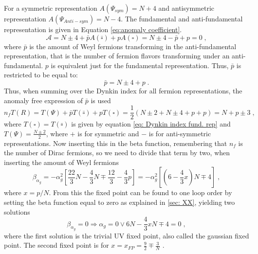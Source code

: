 For a symmetric representation $A(\Psi_{sym})=N+4$ and antisymmetric representation $A(\Psi_{Anti-sym})=N-4$. The fundamental and anti-fundamental representation is given in Equation \ref{eq:anomaly coefficient}. 
\begin{equation}
    \mathcal{A} = N\pm 4 + \bar p A(\bar{\square}) + p A({\square})= N\pm 4 - \bar p  +p= 0 \;,
\end{equation}
where $\bar p$ is the amount of Weyl fermions transforming in the anti-fundamental representation, that is the number of fermion flavors transforming under an anti-fundamental. $p$ is equivalent just for the fundamental representation. Thus, $\bar p$ is restricted to be equal to:
\begin{equation}
    \bar p= N\pm 4 + p  \;.
\end{equation}
Thus, when summing over the Dynkin index for all fermion representations, the anomaly free expression of $\bar p $ is used 
\begin{equation}
    n_f T(R) = T(\Psi) + \bar p T(\bar{\square}) + p T({\square})=\frac{1}{2}\left(N\pm2 + N\pm 4 +p +p\right)=N+p\pm 3\;,
\end{equation}
where $T(\square)=T(\bar \square)$ is given by equation \ref{eq: Dynkin index fund. rep} and $T(\Psi)=\frac{N\pm2}{2}$, where $+$ is for symmetric and $-$ is for anti-symmetric representations.  
Now inserting this in the beta function, remembering that $n_f$ is the number of Dirac fermions, so we need to divide that term by two, when inserting the amount of Weyl fermions 
\begin{equation}
    \beta_{\alpha_{g}}={-\alpha_g^2}\left[ \frac{22}{3}N-\frac{4}{3}N \mp \frac{12}{3}-\frac{4}{3}p\right]={-\alpha_g^2}\left[ \left(6-\frac{4}{3}x\right)N\mp 4\right]\;,
\end{equation}
where $x=p/N$. From this the fixed point can be found to one loop order by setting the beta function equal to zero as explained in \ref{sec: XX}, yielding two solutions
\begin{equation}
    \beta_{\alpha_{g}}=0\Rightarrow \alpha_g=0 \vee 6N-\frac{4}{3}xN \mp 4=0\;,
\end{equation}
where the first solution is the trivial UV fixed point, also called the gaussian fixed point. The second fixed point is for $x=x_{FP}=\frac{9}{2}\mp \frac{3}{N}$ \cite{M_lgaard_2017} .

